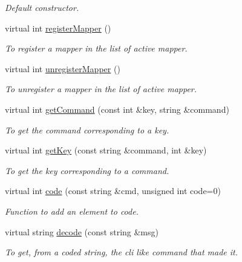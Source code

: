 \begin{DoxyCompactItemize}
\begin{DoxyCompactList}\small\item\em Default constructor. \item\end{DoxyCompactList}\item 
virtual int \hyperlink{classIMSMapper_a5454adaabc0a8049263f2f9c50f71d36}{registerMapper} ()
\begin{DoxyCompactList}\small\item\em To register a mapper in the list of active mapper. \item\end{DoxyCompactList}\item 
virtual int \hyperlink{classIMSMapper_a688bf20409385a8c7505164153d243ac}{unregisterMapper} ()
\begin{DoxyCompactList}\small\item\em To unregister a mapper in the list of active mapper. \item\end{DoxyCompactList}\item 
virtual int \hyperlink{classIMSMapper_a25a97459b750bf8204178b9a18637113}{getCommand} (const int \&key, string \&command)
\begin{DoxyCompactList}\small\item\em To get the command corresponding to a key. \item\end{DoxyCompactList}\item 
virtual int \hyperlink{classIMSMapper_a762164cb091f97d2a4698de59cc66cb5}{getKey} (const string \&command, int \&key)
\begin{DoxyCompactList}\small\item\em To get the key corresponding to a command. \item\end{DoxyCompactList}\item 
virtual int \hyperlink{classIMSMapper_ac972651946c18f94bc683654462ccecd}{code} (const string \&cmd, unsigned int code=0)
\begin{DoxyCompactList}\small\item\em Function to add an element to code. \item\end{DoxyCompactList}\item 
virtual string \hyperlink{classIMSMapper_a39e3b6ab30b0c8f49a4acf2a25241700}{decode} (const string \&msg)
\begin{DoxyCompactList}\small\item\em To get, from a coded string, the cli like command that made it. \item\end{DoxyCompactList}\end{DoxyCompactItemize}
